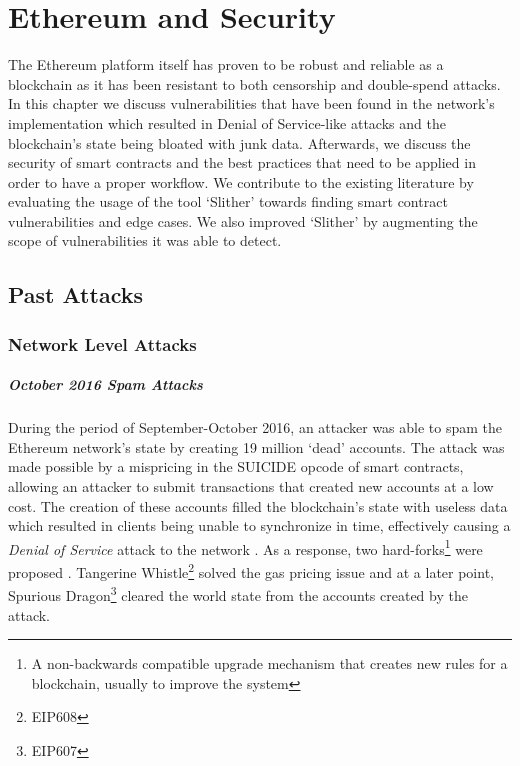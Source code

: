 \chapter{Ethereum and Security} \label{security}

The Ethereum platform itself has proven to be robust and reliable as a blockchain as it has been resistant to both censorship and double-spend attacks. In this chapter we discuss vulnerabilities that have been found in the network's implementation which resulted in Denial of Service-like attacks and the blockchain's state being bloated with junk data. Afterwards, we discuss the security of smart contracts and the best practices that need to be applied in order to have a proper workflow. We contribute to the existing literature by evaluating the usage of the tool `Slither' towards finding smart contract vulnerabilities and edge cases. We also improved `Slither' by augmenting the scope of vulnerabilities it was able to detect.

\section{Past Attacks}
\subsection{Network Level Attacks}

\paragraph{October 2016 Spam Attacks}
During the period of September-October 2016, an attacker was able to spam the Ethereum network's state by creating 19 million `dead' accounts. The attack was made possible by a mispricing in the SUICIDE opcode of smart contracts, allowing an attacker to submit transactions that created new accounts at a low cost. The creation of these accounts filled the blockchain's state with useless data which resulted in clients being unable to synchronize in time, effectively causing a \textit{Denial of Service} attack to the network \cite{eip150faq}. As a response, two hard-forks\footnote{A non-backwards compatible upgrade mechanism that creates new rules for a blockchain, usually to improve the system} were proposed \cite{eip607, eip608}. Tangerine Whistle\footnote{EIP608} solved the gas pricing issue and at a later point, Spurious Dragon\footnote{EIP607} cleared the world state from the accounts created by the attack. 

